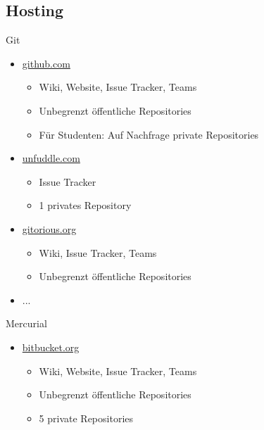 \documentclass[presentation]{beamer}
\begin{document}
\subsection{Hosting}
\begin{frame}{Git}
  \begin{itemize}
  \item <1-> \href{http://github.com}{github.com}
    \begin{itemize}
    \item Wiki, Website, Issue Tracker, Teams
    \item Unbegrenzt öffentliche Repositories
    \item Für Studenten: Auf Nachfrage private Repositories
    \end{itemize}
  \item<2-> \href{http://unfuddle.com}{unfuddle.com}
    \begin{itemize}
    \item Issue Tracker
    \item 1 privates Repository
    \end{itemize}
  \item<3-> \href{http://gitorious.org}{gitorious.org}
    \begin{itemize}
    \item Wiki, Issue Tracker, Teams
    \item Unbegrenzt öffentliche Repositories
    \end{itemize}
  \item<4-> ...
  \end{itemize}
\end{frame}
\begin{frame}{Mercurial}
  \begin{itemize}
  \item<1-> \href{http://bitbucket.org}{bitbucket.org}
    \begin{itemize}
    \item Wiki, Website, Issue Tracker, Teams
    \item Unbegrenzt öffentliche Repositories
    \item 5 private Repositories
    \end{itemize}
  \end{itemize}
\end{frame}
\end{document}
